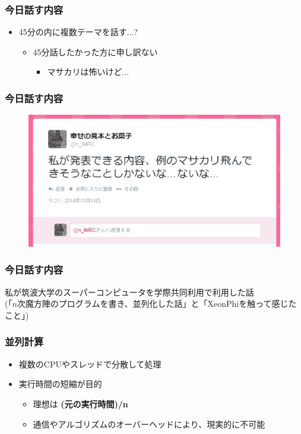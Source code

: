 \documentclass[dvipdfmx,20pt,notheorems,t]{beamer}
\begin{document}
\begin{frame}\frametitle{今日話す内容}
\begin{itemize}
\item 45分の内に複数テーマを話す...?
\begin{itemize}
\item 45分話したかった方に申し訳ない
\begin{itemize}
\item マサカリは怖いけど...
\end{itemize}
\end{itemize}
\end{itemize}
\end{frame}
\begin{frame}\frametitle{今日話す内容}
\begin{figure}[htb]
\centering
\includegraphics[width=\textwidth]{2.eps}
\end{figure}
\end{frame}
\begin{frame}\frametitle{今日話す内容}
\centering
\large
\vspace*{\fill}
私が筑波大学のスーパーコンピュータを学際共同利用で利用した話 \\
(「$n$次魔方陣のプログラムを書き、並列化した話」と「XeonPhiを触って感じたこと」)
\vspace*{\fill}
\end{frame}

\begin{frame}\frametitle{並列計算}
\begin{itemize}
\item 複数のCPUやスレッドで分散して処理
\item 実行時間の短縮が目的
\begin{itemize}
\item 理想は \textbf{(元の実行時間)/n}
\item 通信やアルゴリズムのオーバーヘッドにより、現実的に不可能
\end{itemize}
\end{itemize}
\end{frame}
\end{document}
